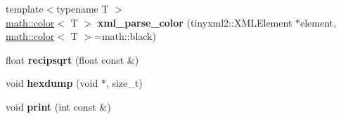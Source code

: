 \begin{DoxyCompactItemize}
\item 
\hypertarget{namespacemath_a22341528dfea412882791429a76cbb3e}{
{\footnotesize template$<$typename T $>$ }\\\hyperlink{classmath_1_1color}{math::color}$<$ T $>$ {\bfseries xml\_\-parse\_\-color} (tinyxml2::XMLElement $\ast$element, \hyperlink{classmath_1_1color}{math::color}$<$ T $>$=math::black)}
\label{namespacemath_a22341528dfea412882791429a76cbb3e}

\item 
\hypertarget{namespacemath_aab0f4b6e5450449993509452ec3f5346}{
float {\bfseries recipsqrt} (float const \&)}
\label{namespacemath_aab0f4b6e5450449993509452ec3f5346}

\item 
\hypertarget{namespacemath_ae4ed1a3349ed01004dec19f19339135e}{
void {\bfseries hexdump} (void $\ast$, size\_\-t)}
\label{namespacemath_ae4ed1a3349ed01004dec19f19339135e}

\item 
\hypertarget{namespacemath_a144127efcc97b1934306ac15a5f6d66d}{
void {\bfseries print} (int const \&)}
\label{namespacemath_a144127efcc97b1934306ac15a5f6d66d}

\end{DoxyCompactItemize}
